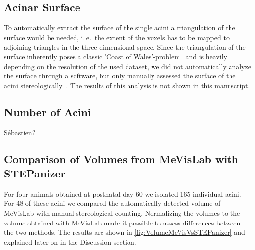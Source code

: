 \documentclass[%
	twoside,
	paper=a4,%
	abstract=true,%
	]{scrartcl}
\newcommand{\ie}{i.\,e.\ }
\newcommand{\numberofacini}{48}
\begin{document}
\subsection{Acinar Surface}
To automatically extract the surface of the single acini a triangulation of the surface would be needed, \ie the extent of the voxels has to be mapped to adjoining triangles in the three-dimensional space. Since the triangulation of the surface inherently poses a classic 'Coast of Wales'-problem~\cite{Mandelbrot1967a} and is heavily depending on the resolution of the used dataset, we did not automatically analyze the surface through a software, but only manually assessed the surface of the acini stereologically~\cite{Hsia2010}. The results of this analysis is not shown in this manuscript.

\subsection{Number of Acini}
Sébastien?

\subsection{Comparison of Volumes from MeVisLab with STEPanizer}
For four animals obtained at postnatal day 60 we isolated 165 individual acini. For \numberofacini\xspace of these acini we compared the automatically detected volume of MeVisLab with manual stereological counting. Normalizing the volumes to the volume obtained with MeVisLab made it possible to assess differences between the two methods. The results are shown in \autoref{fig:VolumeMeVisVsSTEPanizer} and explained later on in the Discussion section.
\end{document}
